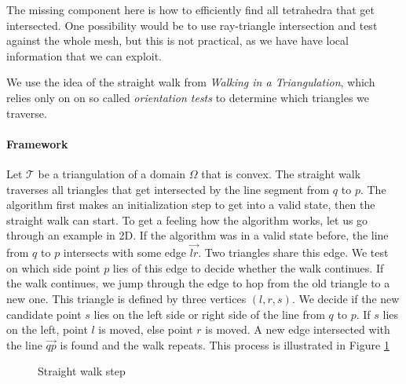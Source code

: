 \documentclass[../thesis.tex]{subfiles}
\begin{document}
The missing component here is how to efficiently find all tetrahedra
that get intersected. One possibility would be to use ray-triangle intersection and
test against the whole mesh, but this is not practical, as we have have local information
that we can exploit.


We use the idea of the straight walk from \emph{Walking in a Triangulation}\cite{Devillers}, which relies only on
on so called \emph{orientation tests} to determine which triangles we traverse.
\paragraph{Framework}
Let $\mathcal{T}$ be a triangulation of a domain $\Omega$ that is convex.
The straight walk traverses all triangles that get intersected by the line segment
from $q$ to $p$. The algorithm first makes an initialization step to get into a valid state, 
then the straight walk can start.
To get a feeling how the algorithm works, let us go through an example in 2D.
If the algorithm was in a valid state before, the line from $q$ to $p$
intersects with some edge $\vec{lr}$. Two triangles share this edge.
We test on which side point $p$ lies of this edge to decide whether the walk continues.
If the walk continues, we jump through the edge to hop from the old triangle to a new one.
This triangle is defined by three vertices $(l,r,s)$. We decide if
the new candidate point $s$ lies on the left side or right side of the line from $q$ to $p$.
If $s$ lies on the left, point $l$ is moved, else point $r$ is moved.
A new edge intersected with the line $\vec{qp}$ is found and the walk repeats.
This process is illustrated in Figure \ref{alg:straight-walk-2d}
\begin{figure}[htb]
  \centering
  \def\svgwidth{35em}
  
  \caption{Straight walk step}\label{alg:straight-walk-2d}        
\end{figure}
\end{document}
